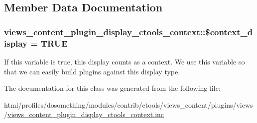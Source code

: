 \subsection{Member Data Documentation}
\hypertarget{classviews__content__plugin__display__ctools__context_aaf85835385bb74b3d8c365f6caeea219}{
\subsubsection[{\$context\_\-display}]{\setlength{\rightskip}{0pt plus 5cm}views\_\-content\_\-plugin\_\-display\_\-ctools\_\-context::\$context\_\-display = TRUE}}
\label{classviews__content__plugin__display__ctools__context_aaf85835385bb74b3d8c365f6caeea219}
If this variable is true, this display counts as a context. We use this variable so that we can easily build plugins against this display type. 

The documentation for this class was generated from the following file:\begin{DoxyCompactItemize}
\item 
html/profiles/dosomething/modules/contrib/ctools/views\_\-content/plugins/views/\hyperlink{views__content__plugin__display__ctools__context_8inc}{views\_\-content\_\-plugin\_\-display\_\-ctools\_\-context.inc}\end{DoxyCompactItemize}
